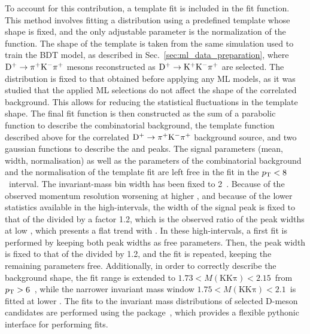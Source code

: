 To account for this contribution, a template fit is included in the fit function. This method involves fitting a distribution using a predefined template whose shape is fixed, and the only adjustable parameter is the normalization of the function. The shape of the template is taken from the same simulation used to train the BDT model, as described in Sec.~\ref{sec:ml_data_preparation}, where $\mathrm{D^+}\rightarrow\mathrm{\pi^+K^-\pi^+}$ mesons reconstructed as $\mathrm{D^+}\rightarrow\mathrm{K^+K^-\pi^+}$ are selected. The distribution is fixed to that obtained before applying any ML models, as it was studied that the applied ML selections do not affect the shape of the correlated background. This allows for reducing the statistical fluctuations in the template shape. The final fit function is then constructed as the sum of a parabolic function to describe the combinatorial background, the template function described above for the correlated $\mathrm{D^+}\rightarrow\mathrm{\pi^+K^-\pi^+}$ background source, and two gaussian functions to describe the \ds and \dpl peaks. The signal parameters (mean, width, normalisation) as well as the parameters of the combinatorial background and the normalisation of the template fit are left free in the fit in the $p_\mathrm{T}<8$~\gevc interval. The invariant-mass bin width has been fixed to 2~\mevcc. Because of the observed momentum resolution worsening at higher \pt, and because of the lower statistics available in the high-\pt intervals, the width of the \dpl signal peak is fixed to that of the \ds divided by a factor 1.2, which is the observed ratio of the peak widths at low \pt, which presents a flat trend with \pt. In these high-\pt intervals, a first fit is performed by keeping both peak widths as free parameters. Then, the \dpl peak width is fixed to that of the \ds divided by 1.2, and the fit is repeated, keeping the remaining parameters free. Additionally, in order to correctly describe the background shape, the fit range is extended to $1.73<M(\mathrm{KK\pi})<2.15$~\gevcc from $p_\mathrm{T}>6$~\gevc, while the narrower invariant mass window $1.75<M(\mathrm{KK\pi})<2.1$~\gevcc is fitted at lower \pt. The fits to the invariant mass distributions of selected D-meson candidates are performed using the  package~\cite{grosa_2023_7579657}, which provides a flexible pythonic interface for performing fits. 


